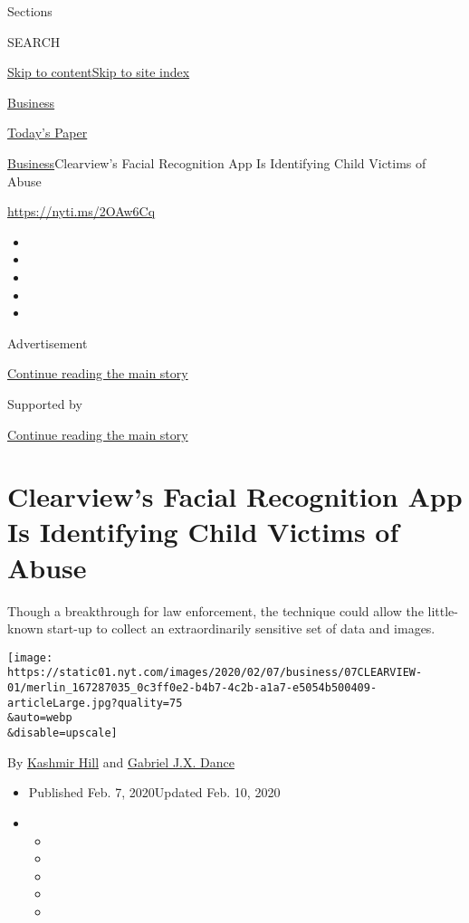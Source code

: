 Sections

SEARCH

\protect\hyperlink{site-content}{Skip to
content}\protect\hyperlink{site-index}{Skip to site index}

\href{https://www.nytimes.com/section/business}{Business}

\href{https://myaccount.nytimes.com/auth/login?response_type=cookie\&client_id=vi}{}

\href{https://www.nytimes.com/section/todayspaper}{Today's Paper}

\href{/section/business}{Business}\textbar{}Clearview's Facial
Recognition App Is Identifying Child Victims of Abuse

\url{https://nyti.ms/2OAw6Cq}

\begin{itemize}
\item
\item
\item
\item
\item
\end{itemize}

Advertisement

\protect\hyperlink{after-top}{Continue reading the main story}

Supported by

\protect\hyperlink{after-sponsor}{Continue reading the main story}

\hypertarget{clearviews-facial-recognition-app-is-identifying-child-victims-of-abuse}{%
\section{Clearview's Facial Recognition App Is Identifying Child Victims
of
Abuse}\label{clearviews-facial-recognition-app-is-identifying-child-victims-of-abuse}}

Though a breakthrough for law enforcement, the technique could allow the
little-known start-up to collect an extraordinarily sensitive set of
data and images.

\texttt{[image: https://static01.nyt.com/images/2020/02/07/business/07CLEARVIEW-01/merlin\_167287035\_0c3ff0e2-b4b7-4c2b-a1a7-e5054b500409-articleLarge.jpg?quality=75\\\&auto=webp\\\&disable=upscale]}

By \href{https://www.nytimes.com/by/kashmir-hill}{Kashmir Hill} and
\href{https://www.nytimes.com/by/gabriel-dance}{Gabriel J.X. Dance}

\begin{itemize}
\item
  Published Feb. 7, 2020Updated Feb. 10, 2020
\item
  \begin{itemize}
  \item
  \item
  \item
  \item
  \item
  \end{itemize}
\end{itemize}

